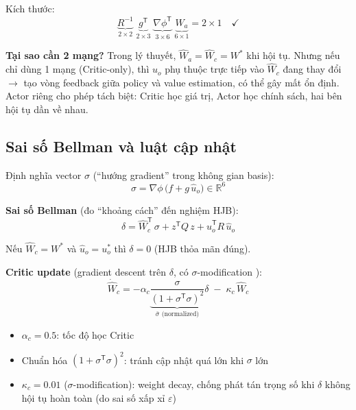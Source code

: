 \documentclass[12pt,a4paper]{article}
\newcommand{\R}{\mathbb{R}}
\newcommand{\T}{\mathsf{T}}
\begin{document}
Kích thước:
\[
    \underbrace{R^{-1}}_{2\times 2}\; \underbrace{g^\T}_{2\times 3}\; \underbrace{\nabla\phi^\T}_{3\times 6}\; \underbrace{\hat{W}_a}_{6\times 1} = 2\times 1 \quad \checkmark
\]

\textbf{Tại sao cần 2 mạng?} Trong lý thuyết, $\hat{W}_a = \hat{W}_c = W^*$ khi hội tụ. Nhưng nếu chỉ dùng 1 mạng (Critic-only), thì $u_o$ phụ thuộc trực tiếp vào $\hat{W}_c$ đang thay đổi $\to$ tạo vòng feedback giữa policy và value estimation, có thể gây mất ổn định. Actor riêng cho phép tách biệt: Critic học giá trị, Actor học chính sách, hai bên hội tụ dần về nhau.

\subsection{Sai số Bellman và luật cập nhật}

Định nghĩa vector $\sigma$ (``hướng gradient'' trong không gian basis):
\begin{equation}
    \sigma = \nabla\phi\,\big(f + g\,\hat{u}_o\big) \in \R^6
\end{equation}

\textbf{Sai số Bellman} (đo ``khoảng cách'' đến nghiệm HJB):
\begin{equation}\label{eq:bellman_error}
    \delta = \hat{W}_c^\T\, \sigma + z^\T Q\, z + \hat{u}_o^\T R\, \hat{u}_o
\end{equation}

Nếu $\hat{W}_c = W^*$ và $\hat{u}_o = u_o^*$ thì $\delta = 0$ (HJB thỏa mãn đúng).

\textbf{Critic update} (gradient descent trên $\delta$, có $\sigma$-modification \cite{Vamvoudakis2010}):
\begin{equation}\label{eq:critic_law}
    \dot{\hat{W}}_c = -\alpha_c \underbrace{\frac{\sigma}{(1+\sigma^\T\sigma)^2}}_{\bar{\sigma}\text{ (normalized)}} \delta \;-\; \kappa_c\, \hat{W}_c
\end{equation}

\begin{itemize}[nosep]
    \item $\alpha_c = 0.5$: tốc độ học Critic
    \item Chuẩn hóa $(1+\sigma^\T\sigma)^2$: tránh cập nhật quá lớn khi $\sigma$ lớn
    \item $\kappa_c = 0.01$ ($\sigma$-modification): weight decay, chống phát tán trọng số khi $\delta$ không hội tụ hoàn toàn (do sai số xấp xỉ $\varepsilon$)
\end{itemize}
\end{document}
